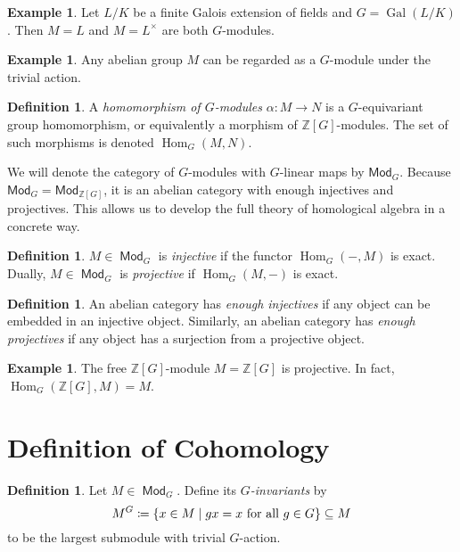 \documentclass[leqno, openany]{memoir}
\theoremstyle{definition}
\newtheorem{defn}[thm]{Definition}
\newtheorem{exm}[thm]{Example}
\theoremstyle{remark}
\theoremstyle{plain}
\theoremstyle{definition}
\theoremstyle{remark}
\newcommand{\Z}{\mathbb{Z}}
\newcommand{\ms}[1]{\mathsf{#1}}
\DeclareMathOperator{\Hom}{Hom}
\DeclareMathOperator{\Gal}{Gal}
\DeclareMathOperator{\Mod}{\mathsf{Mod}}
\begin{document}
\begin{exm} Let $L/K$ be a finite Galois extension of fields and $G =
\Gal(L/K)$. Then $M = L$ and $M = L^{\times}$ are both $G$-modules.  \end{exm}

\begin{exm} Any abelian group $M$ can be regarded as a $G$-module under the
trivial action.  \end{exm}

\begin{defn} A \textit{homomorphism of $G$-modules} $\alpha \colon M \to N$ is
a $G$-equivariant group homomorphism, or equivalently a morphism of
$\Z[G]$-modules. The set of such morphisms is denoted $\Hom_G(M,N)$.
\end{defn}

We will denote the category of $G$-modules with $G$-linear maps by
$\ms{Mod}_G$. Because $\ms{Mod}_G = \ms{Mod}_{\Z[G]}$, it is an abelian
category with enough injectives and projectives. This allows us to develop the
full theory of homological algebra in a concrete way.

\begin{defn} $M \in \Mod_G$ is \textit{injective} if the functor $\Hom_G(-,M)$
is exact. Dually, $M \in \Mod_G$ is \textit{projective} if $\Hom_G(M,-)$ is
exact.  \end{defn}

\begin{defn} An abelian category has \textit{enough injectives} if any object
can be embedded in an injective object. Similarly, an abelian category has
\textit{enough projectives} if any object has a surjection from a projective
object.  \end{defn}

\begin{exm} The free $\Z[G]$-module $M = \Z[G]$ is projective. In fact,
$\Hom_G(\Z[G], M) = M$.  \end{exm}

\section{Definition of Cohomology}%

\begin{defn} Let $M \in \Mod_G$. Define its \textit{$G$-invariants} by \[ M^G
\coloneqq \qty{ x \in M \mid gx = x\ \text{for all}\ g \in G } \subseteq M \]
to be the largest submodule with trivial $G$-action.  \end{defn}
\end{document}
